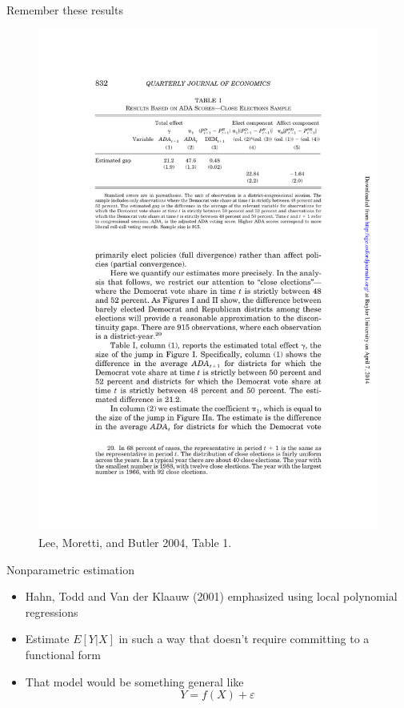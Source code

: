 \documentclass{beamer}
\begin{document}
\begin{frame}{Remember these results}
	
	\begin{figure}
	\includegraphics[scale=0.75]{./lecture_includes/lee_table1.pdf}
	\caption{Lee, Moretti, and Butler 2004, Table 1.}
	\end{figure}
\end{frame}


\clearpage
\newpage

	
\begin{frame}{Nonparametric estimation}
	
	\begin{itemize}
	\item Hahn, Todd and Van der Klaauw (2001) emphasized using local polynomial regressions
	\item Estimate $E[Y|X]$ in such a way that doesn't require committing to a functional form 
	\item That model would be something general like$$Y=f(X) + \varepsilon$$
	\end{itemize}
\end{frame}
\end{document}
